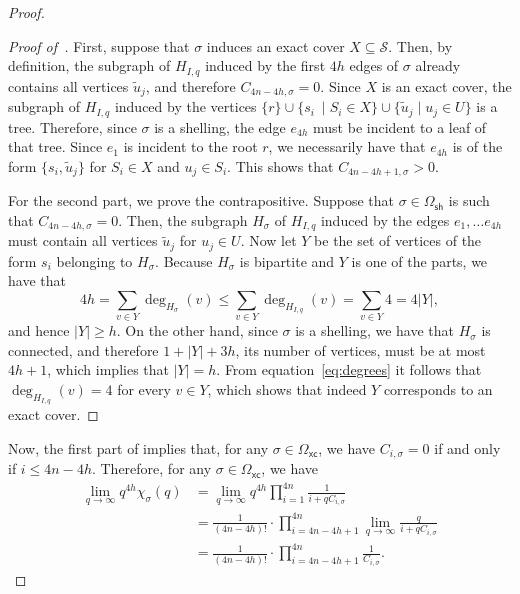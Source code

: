 \documentclass[11pt]{amsart}
\newcommand{\ns}{s}
\newcommand{\nou}{\tilde{u}}
\newcommand{\omsh}{\Omega_{\mathsf{sh}}}
\newcommand{\omxc}{\Omega_{\mathsf{xc}}}
\begin{document}
\begin{proof}
\begin{proof}[Proof of~]
First, suppose that $\sigma$ induces an exact cover $X \subseteq \mathcal{S}$. Then, by definition, the subgraph of $H_{I, q}$ induced by the first $4h$ edges of $\sigma$ already contains all vertices $\nou_j$, and therefore $C_{4n-4h, \sigma} = 0$.
Since $X$ is an exact cover, the subgraph of $H_{I, q}$ induced by the vertices
    \(
    \{ r \} \cup \{ \ns_i\ \mid S_i \in X\} \cup \{\nou_j \mid u_j \in U \}
    \)
is a tree. Therefore, since $\sigma$ is a shelling, the edge $e_{4h}$ must be incident to a leaf of that tree. Since $e_1$ is incident to the root $r$, we necessarily have that $e_{4h}$ is of the form $\{\ns_i, \nou_j\}$ for $S_i \in X$ and $u_j \in S_i$. This shows that $C_{4n-4h+1, \sigma} > 0$.

For the second part, we prove the contrapositive. Suppose that $\sigma \in \omsh$ is such that $C_{4n-4h, \sigma} = 0$. Then, the subgraph $H_{\sigma}$ of $H_{I, q}$ induced by the edges $e_1, \dots e_{4h}$ must contain all vertices $\nou_j$ for $u_j \in U$. Now let $Y$ be the set of vertices of the form $\ns_i$ belonging to $H_\sigma$. Because $H_\sigma$ is bipartite and $Y$ is one of the parts, we have that
\begin{equation}\label{eq:degrees}
      4h = \sum_{v \in Y}{\deg_{H_{\sigma}}(v)} \leq \sum_{v \in Y}{\deg_{H_{I, q}}(v)} = \sum_{v \in Y}{4} = 4|Y|,
      \end{equation}
and hence $|Y| \geq h$. On the other hand, since $\sigma$ is a shelling, we have that $H_\sigma$ is connected, and therefore $1+|Y|+3h$, its number of vertices, must be at most $4h+1$, which implies that $|Y| = h$. From equation~\eqref{eq:degrees} it follows that $\deg_{H_{I, q}}(v) = 4$ for every $v \in Y$, which shows that indeed $Y$ corresponds to an exact cover.
\end{proof} 

Now, the first part of  implies that, for any $\sigma \in \omxc $, we have $C_{i, \sigma} = 0$ if and only if $i \leq 4n - 4h$. Therefore, for any $\sigma \in \omxc$, we have
\begin{align*}
\lim_{q \to \infty} q^{4h} \chi_{\sigma}(q) &= \lim_{q \to \infty} q^{4h} \prod_{i=1}^{4n} \frac{1}{i + q C_{i, \sigma}} \\ &= \frac{1}{(4n-4h)!} \cdot \prod_{i=4n-4h+1}^{4n}\lim_{q \to \infty} \frac{q}{i+qC_{i, \sigma}}\\
&= \frac{1}{(4n-4h)!} \cdot \prod_{i=4n-4h+1}^{4n}\frac{1}{C_{i,\sigma}}.
\end{align*}


\end{proof}
\end{document}
